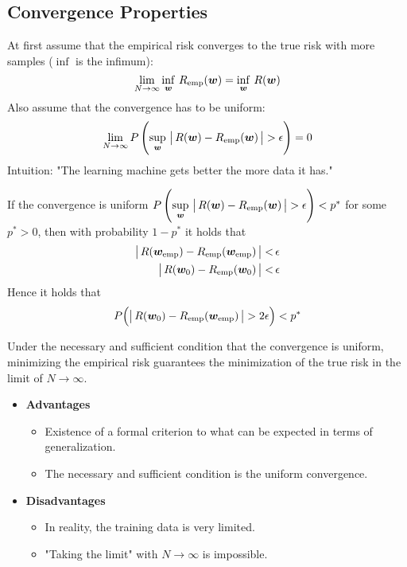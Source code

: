 		\subsection{Convergence Properties}
			At first assume that the empirical risk converges to the true risk with more samples (\(\inf\) is the infimum):
			\begin{equation}
				\lim\limits_{N \to \infty} \inf\limits_{\bm{w}} \, R_{{\operatorname{emp}}}(\bm{w}) = \inf\limits_{\bm{w}} \, R(\bm{w})
			\end{equation}
			Also assume that the convergence has to be uniform:
			\begin{equation}
				\lim\limits_{N \to \infty} P\,\Bigg(\! \sup\limits_{\bm{w}} \, \big\lvert\, R(\bm{w}) - R_{{\operatorname{emp}}}(\bm{w}) \,\big\rvert > \epsilon \Bigg) = 0
			\end{equation}
			Intuition: "The learning machine gets better the more data it has."
			
			If the convergence is uniform \( P\,\Bigg(\! \sup\limits_{\bm{w}} \, \big\lvert\, R(\bm{w}) - R_{{\operatorname{emp}}}(\bm{w}) \,\big\rvert > \epsilon \Bigg) < p^\ast \) for some \( p^\ast > 0 \), then with probability \( 1 - p^\ast \) it holds that
			\begin{align}
				\big\lvert\, R(\bm{w}_{{\operatorname{emp}}}) - R_{{\operatorname{emp}}}(\bm{w}_{{\operatorname{emp}}}) \,\big\rvert < & \,\epsilon \\
				\big\lvert\, R(\bm{w}_0) - R_{{\operatorname{emp}}}(\bm{w}_0) \,\big\rvert <       & \,\epsilon
			\end{align}
			Hence it holds that
			\begin{equation}
				P\Big( \big\lvert\, R(\bm{w}_0) - R_{{\operatorname{emp}}}(\bm{w}_{{\operatorname{emp}}}) \,\big\rvert > 2\epsilon \Big) < p^\ast \\
			\end{equation}
			
			Under the necessary and sufficient condition that the convergence is uniform, minimizing the empirical risk guarantees the minimization of the true risk in the limit of \( N \to \infty \).
			
			\begin{itemize}
				\item \textbf{Advantages}
					\begin{itemize}
						\item Existence of a formal criterion to what can be expected in terms of generalization.
						\item The necessary and sufficient condition is the uniform convergence.
					\end{itemize}
				\item \textbf{Disadvantages}
					\begin{itemize}
						\item In reality, the training data is very limited.
						\item "Taking the limit" with \( N \to \infty \) is impossible.
					\end{itemize}
			\end{itemize}

